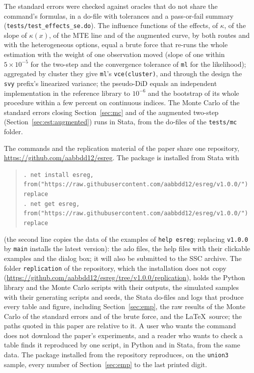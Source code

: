 \documentclass[11pt,a4paper]{article}
\theoremstyle{plain}
\theoremstyle{definition}
\theoremstyle{remark}
\newcommand{\1}{\mathbf{1}}
\newcommand{\cmd}[1]{\texttt{#1}}
\newcommand{\kX}{\kappa(x)}
\begin{document}
The standard errors were checked against oracles that do not share the
command's formulas, in a do-file with tolerances and a pass-or-fail
summary (\cmd{tests/test\_effects\_se.do}). The influence functions of
the effects, of $\kappa$, of the slope of $\kX$, of the MTE line and of
the augmented curve, by both routes and with the heterogeneous options,
equal a brute force that re-runs the whole estimation with the weight of
one observation moved (slope of one within $5\times10^{-5}$ for the
two-step and the convergence tolerance of \cmd{ml} for the likelihood);
aggregated by cluster they give \cmd{ml}'s \cmd{vce(cluster)}, and through
the design the \cmd{svy} prefix's linearized variance; the pseudo-DiD
equals an independent implementation in the reference library to
$10^{-6}$ and the bootstrap of its whole procedure within a few percent
on continuous indices. The Monte Carlo of the standard errors closing
Section~\ref{sec:mc} and of the augmented two-step
(Section~\ref{sec:est:augmented}) runs in Stata, from the do-files of the
\cmd{tests/mc} folder.

The commands and the replication material of the paper share one
repository, \url{https://github.com/aabbdd12/esreg}. The package is
installed from Stata with
\begin{quote}
\footnotesize\cmd{. net install esreg, from("https://raw.githubusercontent.com/aabbdd12/esreg/v1.0.0/") replace}\\
\cmd{. net get esreg, from("https://raw.githubusercontent.com/aabbdd12/esreg/v1.0.0/") replace}
\end{quote}
(the second line copies the data of the examples of \cmd{help esreg};
replacing \cmd{v1.0.0} by \cmd{main} installs the latest version): the ado
files, the help files with their clickable examples and the dialog box; it
will also be submitted to the SSC archive. The folder \cmd{replication} of
the repository, which the installation does not copy
(\url{https://github.com/aabbdd12/esreg/tree/v1.0.0/replication}), holds
the Python library and the Monte Carlo scripts with their outputs, the
simulated samples with their generating scripts and seeds, the Stata
do-files and logs that produce every table and figure, including
Section~\ref{sec:emp}, the raw results of the Monte Carlo of the standard
errors and of the brute force, and the \LaTeX\ source; the paths quoted in
this paper are relative to it. A user who wants the command does not
download the paper's experiments, and a reader who wants to check a table
finds it reproduced by one script, in Python and in Stata, from the same
data. The package
installed from the repository reproduces, on the \cmd{union3} sample,
every number of Section~\ref{sec:emp} to the last printed digit.
\end{document}
